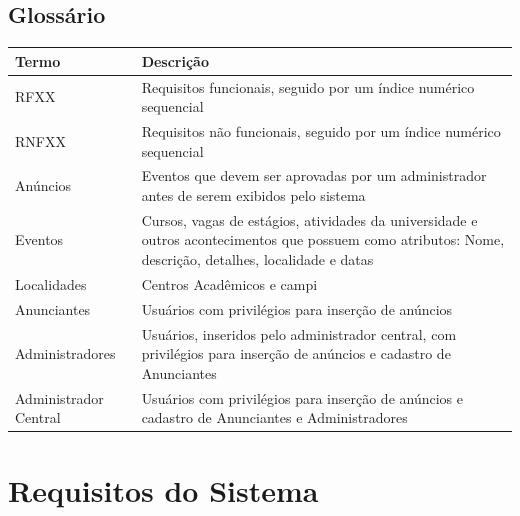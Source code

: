 \documentclass[a4paper, 12pt]{article}
\begin{document}
\subsection{Glossário}
\begin{table}[ht]
	\centering

	\begin{tabular}{p{3cm}p{12cm}}
		\hline
		\cellcolor{gray}Termo&\cellcolor{gray}Descrição  \\
		\hline
		RFXX&Requisitos funcionais, seguido por um índice numérico sequencial\\
		RNFXX&Requisitos não funcionais, seguido por um índice numérico sequencial\\
        An\'{u}ncios&Eventos que devem ser aprovadas por um administrador antes de serem exibidos pelo sistema\\
        Eventos&Cursos, vagas de est\'{a}gios, atividades da universidade e outros acontecimentos que possuem como atributos: Nome, descri\c{c}\~{a}o, detalhes, localidade e datas\\
        Localidades&Centros Acad\^{e}micos e campi\\
        Anunciantes&Usu\'{a}rios com privil\'{e}gios para inser\c{c}\~{a}o de an\'{u}ncios\\
        Administradores&Usu\'{a}rios, inseridos pelo administrador central, com privil\'{e}gios para inser\c{c}\~{a}o de an\'{u}ncios e cadastro de Anunciantes\\
        Administrador Central&Usu\'{a}rios com privil\'{e}gios para inser\c{c}\~{a}o de an\'{u}ncios e cadastro de Anunciantes e Administradores\\
		\hline
	\end{tabular}
\end{table}
\newpage
\section{Requisitos do Sistema}
\end{document}
